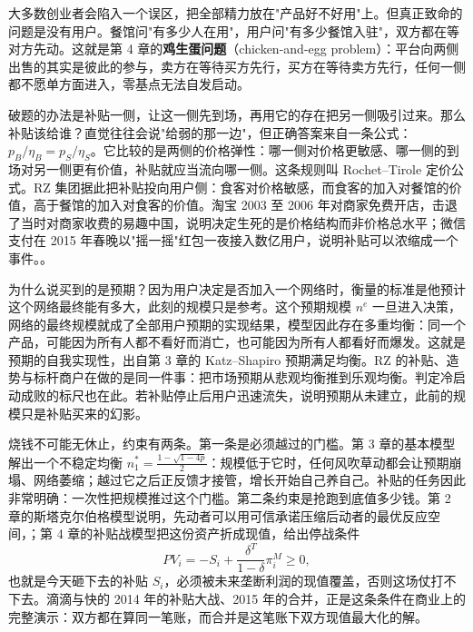 大多数创业者会陷入一个误区，把全部精力放在"产品好不好用"上。但真正致命的问题是没有用户。餐馆问"有多少人在用"，用户问"有多少餐馆入驻"，双方都在等对方先动。这就是第 4 章的\textbf{鸡生蛋问题}（chicken-and-egg problem）：平台向两侧出售的其实是彼此的参与，卖方在等待买方先行，买方在等待卖方先行，任何一侧都不愿单方面进入，零基点无法自发启动。

破题的办法是补贴一侧，让这一侧先到场，再用它的存在把另一侧吸引过来。那么补贴该给谁？直觉往往会说"给弱的那一边"，但正确答案来自一条公式：$p_B/\eta_B=p_S/\eta_S$。它比较的是两侧的价格弹性：哪一侧对价格更敏感、哪一侧的到场对另一侧更有价值，补贴就应当流向哪一侧。这条规则叫 Rochet--Tirole 定价公式。RZ 集团据此把补贴投向用户侧：食客对价格敏感，而食客的加入对餐馆的价值，高于餐馆的加入对食客的价值。淘宝 2003 至 2006 年对商家免费开店，击退了当时对商家收费的易趣中国，说明决定生死的是价格结构而非价格总水平；微信支付在 2015 年春晚以"摇一摇"红包一夜接入数亿用户，说明补贴可以浓缩成一个事件。。

为什么说买到的是预期？因为用户决定是否加入一个网络时，衡量的标准是他预计这个网络最终能有多大，此刻的规模只是参考。这个预期规模 $n^{e}$ 一旦进入决策，网络的最终规模就成了全部用户预期的实现结果，模型因此存在多重均衡：同一个产品，可能因为所有人都不看好而消亡，也可能因为所有人都看好而爆发。这就是预期的自我实现性，出自第 3 章的 Katz--Shapiro 预期满足均衡。RZ 的补贴、造势与标杆商户在做的是同一件事：把市场预期从悲观均衡推到乐观均衡。判定冷启动成败的标尺也在此。若补贴停止后用户迅速流失，说明预期从未建立，此前的规模只是补贴买来的幻影。

烧钱不可能无休止，约束有两条。第一条是必须越过的门槛。第 3 章的基本模型解出一个不稳定均衡 $n_1^{*}=\frac{1-\sqrt{1-4p}}{2}$：规模低于它时，任何风吹草动都会让预期崩塌、网络萎缩；越过它之后正反馈才接管，增长开始自己养自己。补贴的任务因此非常明确：一次性把规模推过这个门槛。第二条约束是抢跑到底值多少钱。第 2 章的斯塔克尔伯格模型说明，先动者可以用可信承诺压缩后动者的最优反应空间，；第 4 章的补贴战模型把这份资产折成现值，给出停战条件
\[
PV_i=-S_i+\frac{\delta^{T}}{1-\delta}\pi_i^{M}\geq 0,
\]
也就是今天砸下去的补贴 $S_i$，必须被未来垄断利润的现值覆盖，否则这场仗打不下去。滴滴与快的 2014 年的补贴大战、2015 年的合并，正是这条条件在商业上的完整演示：双方都在算同一笔账，而合并是这笔账下双方现值最大化的解。

